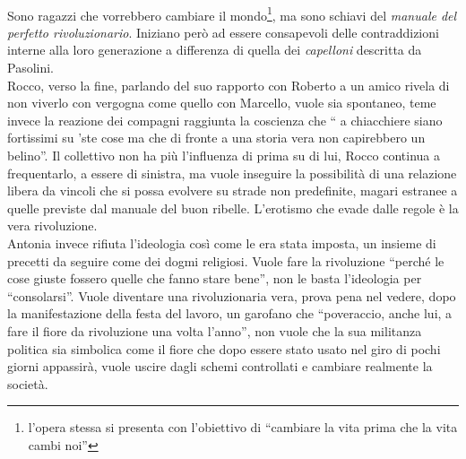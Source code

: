 \paragraph{}Sono ragazzi che vorrebbero cambiare il mondo\footnote{l'opera stessa si presenta con l'obiettivo di \enquote{cambiare la vita prima che la vita cambi noi}}, ma sono schiavi del \textit{manuale del perfetto rivoluzionario}.
Iniziano però ad essere consapevoli delle contraddizioni interne alla loro generazione a differenza di quella dei \textit{capelloni} descritta da Pasolini.
\\Rocco, verso la fine, parlando del suo rapporto con Roberto a un amico rivela di non viverlo con vergogna come quello con Marcello, vuole sia spontaneo, teme invece la reazione dei compagni raggiunta la coscienza che \enquote{ a chiacchiere siano fortissimi su 'ste cose ma che di fronte a una storia vera non capirebbero un belino}.
Il collettivo non ha più l'influenza di prima su di lui, Rocco continua a frequentarlo, a essere di sinistra, ma vuole inseguire la possibilità di una relazione libera da vincoli che si possa evolvere su strade non predefinite, magari estranee a quelle previste dal manuale del buon ribelle.
L'erotismo che evade dalle regole è la vera rivoluzione.
\\Antonia invece rifiuta l'ideologia così come le era stata imposta, un insieme di precetti da seguire come dei dogmi religiosi.
Vuole fare la rivoluzione \enquote{perché le cose giuste fossero quelle che fanno stare bene}, non le basta l'ideologia per \enquote{consolarsi}.
Vuole diventare una rivoluzionaria vera, prova pena nel vedere, dopo la manifestazione della festa del lavoro,  un garofano che \enquote{poveraccio, anche lui, a fare il fiore da rivoluzione una volta l'anno}, non vuole che la sua militanza politica sia simbolica come il fiore che dopo essere stato usato nel giro di pochi giorni appassirà, vuole uscire dagli schemi controllati e cambiare realmente la società.

